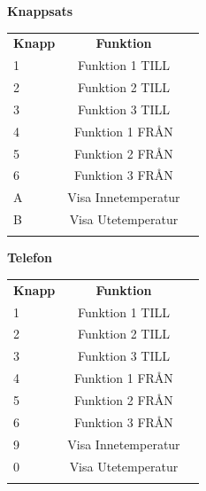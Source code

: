 \documentclass[a4paper,11pt]{article}
\begin{document}
	\begin{table}[ht]
		\begin{minipage}[b]{0.5\linewidth}\centering
			{\bf Knappsats}\\
			\begin{tabular}{l c r}
				\\{\bf Knapp} & {\bf Funktion}\\
				1 & Funktion 1 TILL\\		
				2 & Funktion 2 TILL\\		
				3 & Funktion 3 TILL\\
				4 & Funktion 1 FRÅN\\	
				5 & Funktion 2 FRÅN\\
				6 & Funktion 3 FRÅN\\		
				A & Visa Innetemperatur\\
				B & Visa Utetemperatur \\\\
			\end{tabular}
	 	\end{minipage}
	 	\hspace{0.5cm}
	 	\begin{minipage}[b]{0.5\linewidth}
			\centering
			{\bf Telefon}\\
			\begin{tabular}{l c r}
				\\{\bf Knapp} & {\bf Funktion}\\
				1 & Funktion 1 TILL\\		
				2 & Funktion 2 TILL\\		
				3 & Funktion 3 TILL\\
				4 & Funktion 1 FRÅN\\	
				5 & Funktion 2 FRÅN\\
				6 & Funktion 3 FRÅN\\
				9 & Visa Innetemperatur\\
				0 & Visa Utetemperatur \\\\
			\end{tabular}
	 	\end{minipage}
	\end{table}
\end{document}
